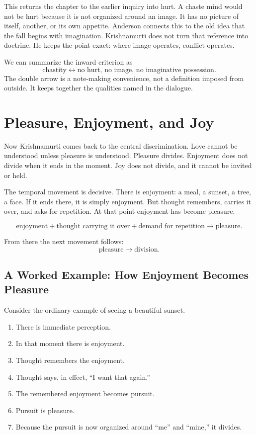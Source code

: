 This returns the chapter to the earlier inquiry into hurt. A chaste mind would not be hurt because it is not organized around an image. It has no picture of itself, another, or its own appetite. Anderson connects this to the old idea that the fall begins with imagination. Krishnamurti does not turn that reference into doctrine. He keeps the point exact: where image operates, conflict operates.

We can summarize the inward criterion as
\begin{equation}
\text{chastity}
\longleftrightarrow
\text{no hurt, no image, no imaginative possession}.
\end{equation}
The double arrow is a note-making convenience, not a definition imposed from outside. It keeps together the qualities named in the dialogue.

\section{Pleasure, Enjoyment, and Joy}

Now Krishnamurti comes back to the central discrimination. Love cannot be understood unless pleasure is understood. Pleasure divides. Enjoyment does not divide when it ends in the moment. Joy does not divide, and it cannot be invited or held.

The temporal movement is decisive. There is enjoyment: a meal, a sunset, a tree, a face. If it ends there, it is simply enjoyment. But thought remembers, carries it over, and asks for repetition. At that point enjoyment has become pleasure.

\begin{equation}
\text{enjoyment}
+
\text{thought carrying it over}
+
\text{demand for repetition}
\longrightarrow
\text{pleasure}.
\end{equation}

From there the next movement follows:
\begin{equation}
\text{pleasure}
\longrightarrow
\text{division}.
\end{equation}

\subsection{A Worked Example: How Enjoyment Becomes Pleasure}

Consider the ordinary example of seeing a beautiful sunset.

\begin{enumerate}
\item There is immediate perception.
\item In that moment there is enjoyment.
\item Thought remembers the enjoyment.
\item Thought says, in effect, ``I want that again.''
\item The remembered enjoyment becomes pursuit.
\item Pursuit is pleasure.
\item Because the pursuit is now organized around ``me'' and ``mine,'' it divides.
\end{enumerate}


